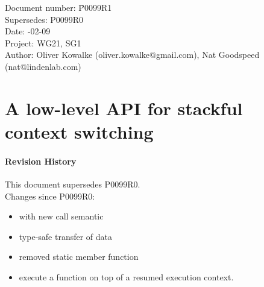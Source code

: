 \documentclass[paper=A4,pagesize,DIV=15]{scrartcl}
\begin{document}
\small
\begin{tabbing}
    Document number: \= P0099R1\\
    Supersedes:      \> P0099R0\\
    Date:            -02-09\\
    Project:         \> WG21, SG1\\
    Author:          \> Oliver Kowalke (oliver.kowalke@gmail.com), Nat Goodspeed (nat@lindenlab.com)\\
\end{tabbing}

\section*{A low-level API for stackful context switching}


\tableofcontents


\paragraph*{Revision History}
This document supersedes P0099R0.\\
\newline
Changes since P0099R0:

\begin{itemize}
    \item \ectx with new call semantic
    \item type-safe transfer of data
    \item removed static member function 
    \item execute a function on top of a resumed execution context.
\end{itemize}












\end{document}
